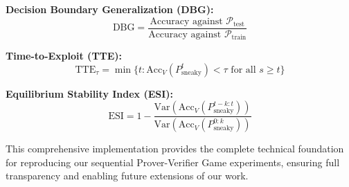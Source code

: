 \textbf{Decision Boundary Generalization (DBG):}
$$\text{DBG} = \frac{\text{Accuracy against } \mathcal{P}_{\text{test}}}{\text{Accuracy against } \mathcal{P}_{\text{train}}}$$

\textbf{Time-to-Exploit (TTE):}
$$\text{TTE}_{\tau} = \min \{t : \text{Acc}_V(P_{\text{sneaky}}^t) < \tau \text{ for all } s \geq t\}$$

\textbf{Equilibrium Stability Index (ESI):}
$$\text{ESI} = 1 - \frac{\text{Var}(\text{Acc}_V(P_{\text{sneaky}}^{t-k:t}))}{\text{Var}(\text{Acc}_V(P_{\text{sneaky}}^{0:k}))}$$

This comprehensive implementation provides the complete technical foundation for reproducing our sequential Prover-Verifier Game experiments, ensuring full transparency and enabling future extensions of our work.

